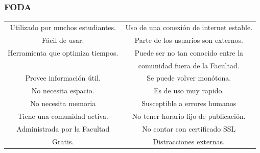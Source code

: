 \documentclass{article}
\begin{document}
\subsubsection*{FODA}
\begin{center}
  \begin{table}[H]
    \centering
    \begin{tabular}{| c | c | }
      \hline
      \cellcolor{green!25}Utilizado por muchos estudiantes. & \cellcolor{yellow!25}Uso de una conexión de internet estable. \\
      \cellcolor{green!25}Fácil de usar. & \cellcolor{yellow!25}Parte de los usuarios son externos. \\
      \cellcolor{green!25}Herramienta que optimiza tiempos. & \cellcolor{yellow!25}Puede ser no tan conocido entre la \\ 
      \cellcolor{green!25}& \cellcolor{yellow!25} comunidad fuera de la Facultad. \\
      \cellcolor{green!25}Provee información útil. & \cellcolor{yellow!25}Se puede volver monótona. \\
      \cellcolor{green!25}No necesita espacio. & \cellcolor{yellow!25}Es de uso muy rapido. \\
      \cellcolor{green!25}No necesita memoria & \cellcolor{yellow!25}Susceptible a errores humanos \\
      \cellcolor{green!25}Tiene una comunidad activa. & \cellcolor{yellow!25}No tener horario fijo de publicación.\\
      \cellcolor{green!25}Administrada por la Facultad & \cellcolor{yellow!25}No contar con certificado SSL\\
      \cellcolor{green!25}Gratis. & \cellcolor{yellow!25}Distracciones externas. \\
      

\end{tabular}
\end{table}
\end{center}
\end{document}
